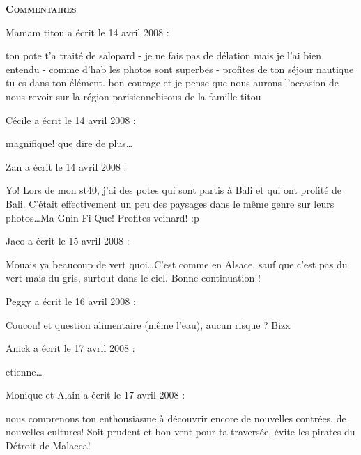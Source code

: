 \bigskip
\textbf{\textsc{Commentaires}}

\medskip
Mamam titou a écrit le 14 avril 2008 :
\begin{displayquote}
ton pote t'a traité de salopard - je ne fais pas de  délation mais je l'ai bien entendu - comme d'hab les photos sont superbes - profites de ton séjour nautique tu es dans ton élément. bon courage et je pense que nous aurons l'occasion de nous revoir sur la région parisienne\dotsgros bisous de la famille titou
\end{displayquote}

\medskip
Cécile a écrit le 14 avril 2008 :
\begin{displayquote}
magnifique! que dire de plus\dots
\end{displayquote}

\medskip
Zan a écrit le 14 avril 2008 :
\begin{displayquote}
Yo!
Lors de mon st40, j'ai des potes qui sont partis à Bali et qui ont profité de Bali. C'était effectivement un peu des paysages dans le même genre sur leurs photos\dots Ma-Gnin-Fi-Que!
Profites veinard! :p
\end{displayquote}

\medskip
Jaco a écrit le 15 avril 2008 :
\begin{displayquote}
Mouais ya beaucoup de vert quoi\dots C'est comme en Alsace, sauf que c'est pas du vert mais du gris, surtout dans le ciel.
Bonne continuation !
\end{displayquote}

\medskip
Peggy a écrit le 16 avril 2008 :
\begin{displayquote}
Coucou!
et question alimentaire (même l'eau), aucun risque ?
Bizx
\end{displayquote}

\medskip
Anick a écrit le 17 avril 2008 :
\begin{displayquote}
etienne\dots
\end{displayquote}

\medskip
Monique et Alain a écrit le 17 avril 2008 :
\begin{displayquote}
nous comprenons ton enthousiasme à découvrir encore de nouvelles contrées, de nouvelles cultures! Soit prudent et bon vent pour ta traversée, évite les pirates du Détroit de Malacca!
\end{displayquote}


